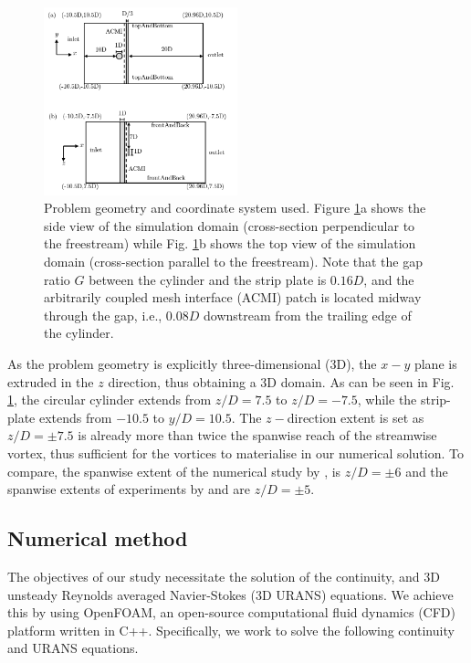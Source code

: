 \documentclass[a4paper,fleqn]{cas-sc}
\begin{document}
\begin{figure}
  \centering
  \includegraphics[width=0.5\textwidth]{figs/figure2}
  \caption{Problem geometry and coordinate system used. Figure \ref{fig:problemGeometry}a shows the side view of the simulation domain (cross-section perpendicular to the freestream) while Fig. \ref{fig:problemGeometry}b shows the top view of the simulation domain (cross-section parallel to the freestream). Note that the gap ratio $G$ between the cylinder and the strip plate is $0.16D$, and the arbitrarily coupled mesh interface (ACMI) patch is located midway through the gap, i.e., $0.08D$ downstream from the trailing edge of the cylinder.}
  \label{fig:problemGeometry}
\end{figure}

As the problem geometry is explicitly three-dimensional (3D), the $x-y$ plane is extruded in the $z$ direction, thus obtaining a 3D domain. As can be seen in Fig. \ref{fig:problemGeometry}, the circular cylinder extends from $z/D=7.5$ to $z/D=-7.5$, while the strip-plate extends from $-10.5$ to $y/D=10.5$. The $z-$direction extent is set as $z/D=\pm7.5$ is already more than twice the spanwise reach of the streamwise vortex, thus sufficient for the vortices to materialise in our numerical solution. To compare, the spanwise extent of the numerical study by \citet{Deng2007}, is $z/D=\pm6$ and the spanwise extents of experiments by \citet{Nguyen2012} and \citet{Koide2013} are $z/D=\pm5$.

\subsection{Numerical method} \label{ssec:numMeth}
The objectives of our study necessitate the solution of the continuity, and 3D unsteady Reynolds averaged Navier-Stokes (3D URANS) equations. We achieve this by using OpenFOAM, an open-source computational fluid dynamics (CFD) platform written in C++. Specifically, we work to solve the following continuity and URANS equations.
\end{document}
